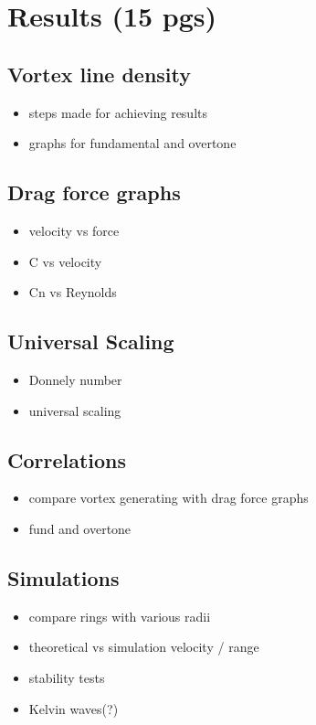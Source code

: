 \chapter{Results (15 pgs)}

\section{Vortex line density}
\begin{itemize}
	\item steps made for achieving results
	\item graphs for fundamental and overtone
\end{itemize}

\section{Drag force graphs}
\begin{itemize}
	\item velocity vs force
	\item C vs velocity
	\item Cn vs Reynolds
\end{itemize}

\section{Universal Scaling}
\begin{itemize}
	\item Donnely number
	\item universal scaling
\end{itemize}

\section{Correlations}
\begin{itemize}
	\item compare vortex generating with drag force graphs
	\item fund and overtone
\end{itemize}

\section{Simulations}
\begin{itemize}
	\item compare rings with various radii
	\item theoretical vs simulation velocity / range
	\item stability tests
	\item Kelvin waves(?)
\end{itemize}

\newpage
